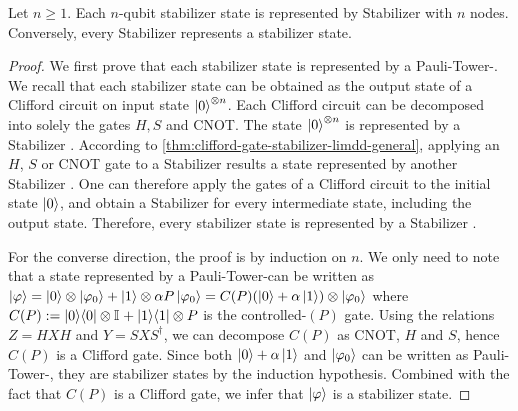 \begin{theorem}
	\label{thm:pauli-tower-limdds-are-stabilizer-states}
    Let $n\geq 1$.
    Each $n$-qubit stabilizer state is represented by Stabilizer \limdd with $n$ nodes.
    Conversely, every Stabilizer \limdd represents a stabilizer state.
\end{theorem}
\begin{proof}

    We first prove that each stabilizer state is represented by a Pauli-Tower-\limdd.
    We recall that each stabilizer state can be obtained as the output state of a Clifford circuit on input state $\ket{0}^{\otimes n}$.
    Each Clifford circuit can be decomposed into solely the gates $H, S$ and CNOT.
    The state $\ket{0}^{\otimes n}$ is represented by a Stabilizer \limdd.
    According to \autoref{thm:clifford-gate-stabilizer-limdd-general}, applying an $H$, $S$ or CNOT gate to a Stabilizer \limdd results a state represented by another Stabilizer \limdd.
    One can therefore apply the gates of a Clifford circuit to the initial state $\ket 0$, and obtain a Stabilizer \limdd for every intermediate state, including the output state.
    Therefore, every stabilizer state is represented by a Stabilizer \limdd.

    For the converse direction, the proof is by induction on $n$.
    We only need to note that a state represented by a Pauli-Tower-\limdd can be written as $\ket{\varphi} = \ket{0} \otimes \ket{\varphi_0} + \ket{1} \otimes \alpha P \ket{\varphi_0} = C(P) (\ket{0} + \alpha \ket{1}) \otimes \ket{\varphi_0}$ where $C( P) := | 0 \rangle \langle 0 | \otimes \mathbb{I}_{} + | 1 \rangle \langle 1 | \otimes P$ is the controlled-$(P)$ gate.
    Using the relations $Z = HXH$ and $Y = SXS^{\dagger}$, we can decompose $C(P)$ as CNOT, $H$ and $S$, hence $C(P)$ is a Clifford gate.
    Since both $\ket{0} + \alpha \ket{1}$ and $\ket{\varphi_0}$ can be written as Pauli-Tower-\limdds, they are stabilizer states by the induction hypothesis.
    Combined with the fact that $C(P)$ is a Clifford gate, we infer that $\ket{\varphi}$ is a stabilizer state.
\end{proof}

